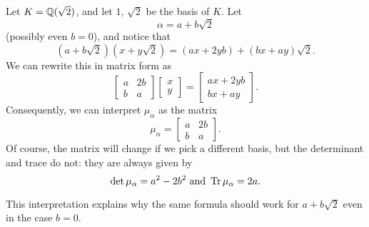 \begin{example}
	Let $K = \mathbb Q(\sqrt2)$, and let $1$, $\sqrt 2$ be the basis of $K$.
	Let \[ \alpha = a + b \sqrt 2 \] (possibly even $b = 0$), and notice that
	\[ \left( a+b\sqrt2 \right) \left(x+y\sqrt2 \right)
		= (ax+2yb) + (bx+ay)\sqrt2. \]
	We can rewrite this in matrix form as
	\[
		\begin{bmatrix}
			a & 2b \\
			b & a
		\end{bmatrix}
		\begin{bmatrix}
			x \\ y
		\end{bmatrix}
		=
		\begin{bmatrix}
			ax+2yb \\ bx+ay
		\end{bmatrix}.
	\]
	Consequently, we can interpret $\mu_\alpha$ as the matrix
	\[ \mu_\alpha =
		\begin{bmatrix}
			a & 2b \\ b & a
		\end{bmatrix}. \]
	Of course, the matrix will change if we pick a different basis,
	but the determinant and trace do not: they are always given by
	\[ \det \mu_\alpha = a^2-2b^2 \text{ and }
		\operatorname{Tr} \mu_\alpha = 2a. \]
\end{example}
This interpretation explains why the same formula should work for $a+b\sqrt 2$
even in the case $b = 0$.

